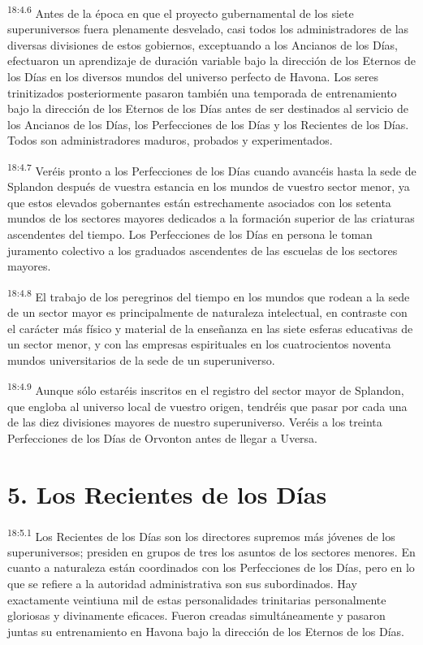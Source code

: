\par
\textsuperscript{18:4.6} Antes de la época en que el proyecto gubernamental de los siete superuniversos fuera plenamente desvelado, casi todos los administradores de las diversas divisiones de estos gobiernos, exceptuando a los Ancianos de los Días, efectuaron un aprendizaje de duración variable bajo la dirección de los Eternos de los Días en los diversos mundos del universo perfecto de Havona. Los seres trinitizados posteriormente pasaron también una temporada de entrenamiento bajo la dirección de los Eternos de los Días antes de ser destinados al servicio de los Ancianos de los Días, los Perfecciones de los Días y los Recientes de los Días. Todos son administradores maduros, probados y experimentados.

\par
\textsuperscript{18:4.7} Veréis pronto a los Perfecciones de los Días cuando avancéis hasta la sede de Splandon después de vuestra estancia en los mundos de vuestro sector menor, ya que estos elevados gobernantes están estrechamente asociados con los setenta mundos de los sectores mayores dedicados a la formación superior de las criaturas ascendentes del tiempo. Los Perfecciones de los Días en persona le toman juramento colectivo a los graduados ascendentes de las escuelas de los sectores mayores.

\par
\textsuperscript{18:4.8} El trabajo de los peregrinos del tiempo en los mundos que rodean a la sede de un sector mayor es principalmente de naturaleza intelectual, en contraste con el carácter más físico y material de la enseñanza en las siete esferas educativas de un sector menor, y con las empresas espirituales en los cuatrocientos noventa mundos universitarios de la sede de un superuniverso.

\par
\textsuperscript{18:4.9} Aunque sólo estaréis inscritos en el registro del sector mayor de Splandon, que engloba al universo local de vuestro origen, tendréis que pasar por cada una de las diez divisiones mayores de nuestro superuniverso. Veréis a los treinta Perfecciones de los Días de Orvonton antes de llegar a Uversa.

\section*{5. Los Recientes de los Días}
\par
\textsuperscript{18:5.1} Los Recientes de los Días son los directores supremos más jóvenes de los superuniversos; presiden en grupos de tres los asuntos de los sectores menores. En cuanto a naturaleza están coordinados con los Perfecciones de los Días, pero en lo que se refiere a la autoridad administrativa son sus subordinados. Hay exactamente veintiuna mil de estas personalidades trinitarias personalmente gloriosas y divinamente eficaces. Fueron creadas simultáneamente y pasaron juntas su entrenamiento en Havona bajo la dirección de los Eternos de los Días.

